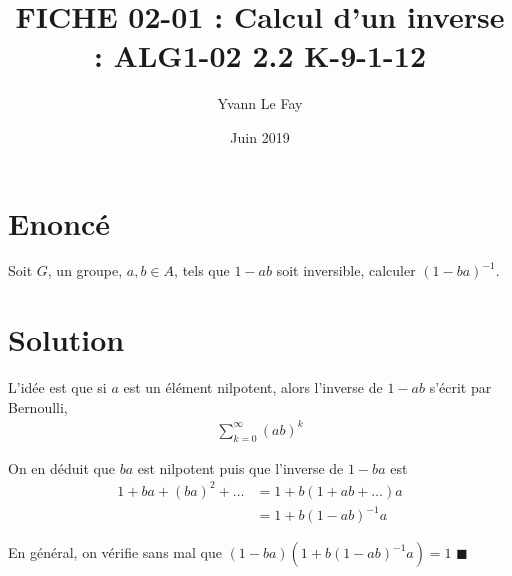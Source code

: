 \documentclass{article}
\newcommand*{\QED}{\hfill\ensuremath{\blacksquare}}%
\begin{document}
\title{FICHE 02-01 : Calcul d'un inverse : ALG1-02 2.2 K-9-1-12}
\author{Yvann Le Fay}
\date{Juin 2019}
\maketitle

\section*{Enoncé}
Soit $G$, un groupe, $a,b\in A$, tels que $1-ab$ soit inversible, calculer $(1-ba)^{-1}$.
\section*{Solution}
L'idée est que si $a$ est un élément nilpotent, alors l'inverse de $1-ab$ s'écrit par Bernoulli,
\begin{align*}
\sum_{k=0}^\infty (ab)^k 
\end{align*}

On en déduit que $ba$ est nilpotent puis que l'inverse de $1-ba$ est
\begin{align*}
1+ba+(ba)^2+\ldots &= 1+b(1+ab+\ldots)a\\
&=1+b(1-ab)^{-1}a
\end{align*}

En général, on vérifie sans mal que $(1-ba)(1+b(1-ab)^{-1}a) = 1$ \QED
\end{document}
